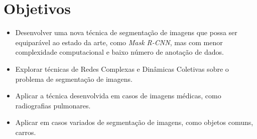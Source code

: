 \chapter{Objetivos}\label{cap:objetivos}

\begin{itemize}
\item Desenvolver uma nova técnica de segmentação de imagens que possa ser
equiparável ao estado da arte, como \textit{Mask R-CNN}, mas com menor
complexidade computacional e baixo número de anotação de dados.
\item Explorar técnicas de Redes Complexas e Dinâmicas Coletivas sobre
  o problema de segmentação de imagens.
\item Aplicar a técnica desenvolvida em casos de imagens médicas, como
  radiografias pulmonares.
\item Aplicar em casos variados de segmentação de imagens, como
  objetos comuns, carros.
\end{itemize}
